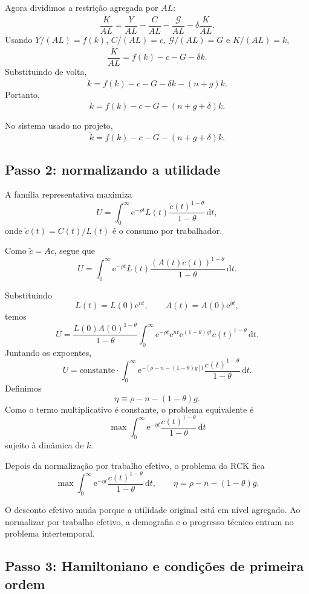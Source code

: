 \documentclass[11pt,a4paper]{article}
\newcommand{\dd}{\mathrm{d}}
\newcommand{\E}{\mathrm{e}}
\begin{document}
Agora dividimos a restri\c{c}\~ao agregada por \(AL\):
\[
\frac{\dot K}{AL}
=
\frac{Y}{AL}-\frac{C}{AL}-\frac{\mathcal G}{AL}-\delta\frac{K}{AL}.
\]
Usando \(Y/(AL)=f(k)\), \(C/(AL)=c\), \(\mathcal G/(AL)=G\) e \(K/(AL)=k\),
\[
\frac{\dot K}{AL}=f(k)-c-G-\delta k.
\]
Substituindo de volta,
\[
\dot k=f(k)-c-G-\delta k-(n+g)k.
\]
Portanto,
\[
\dot k=f(k)-c-G-(n+g+\delta)k.
\]

\begin{resultado}
No sistema usado no projeto,
\[
\dot k=f(k)-c-G-(n+g+\delta)k.
\]
\end{resultado}

\subsection{Passo 2: normalizando a utilidade}

A fam\'ilia representativa maximiza
\[
U=\int_0^\infty \E^{-\rho t}L(t)\frac{\widetilde c(t)^{1-\theta}}{1-\theta}\,\dd t,
\]
onde \(\widetilde c(t)=C(t)/L(t)\) \'e o consumo por trabalhador.

Como \(\widetilde c=A c\), segue que
\[
U
=
\int_0^\infty
\E^{-\rho t}L(t)\frac{(A(t)c(t))^{1-\theta}}{1-\theta}\,\dd t.
\]

Substituindo
\[
L(t)=L(0)\E^{nt},
\qquad
A(t)=A(0)\E^{gt},
\]
temos
\[
U
=
\frac{L(0)A(0)^{1-\theta}}{1-\theta}
\int_0^\infty
\E^{-\rho t}\E^{nt}\E^{(1-\theta)gt}c(t)^{1-\theta}\,\dd t.
\]
Juntando os expoentes,
\[
U
=
\text{constante}\cdot
\int_0^\infty
\E^{-[\rho-n-(1-\theta)g]t}
\frac{c(t)^{1-\theta}}{1-\theta}\,\dd t.
\]
Definimos
\[
\eta\equiv \rho-n-(1-\theta)g.
\]
Como o termo multiplicativo \'e constante, o problema equivalente \'e
\[
\max \int_0^\infty \E^{-\eta t}\frac{c(t)^{1-\theta}}{1-\theta}\,\dd t
\]
sujeito \`a din\^amica de \(k\).

\begin{resultado}
Depois da normaliza\c{c}\~ao por trabalho efetivo, o problema do RCK fica
\[
\max \int_0^\infty \E^{-\eta t}\frac{c(t)^{1-\theta}}{1-\theta}\,\dd t,
\qquad
\eta=\rho-n-(1-\theta)g.
\]
\end{resultado}

\begin{intuicao}
O desconto efetivo muda porque a utilidade original est\'a em n\'ivel agregado.
Ao normalizar por trabalho efetivo, a demografia e o progresso t\'ecnico entram
no problema intertemporal.
\end{intuicao}

\subsection{Passo 3: Hamiltoniano e condi\c{c}\~oes de primeira ordem}
\end{document}
